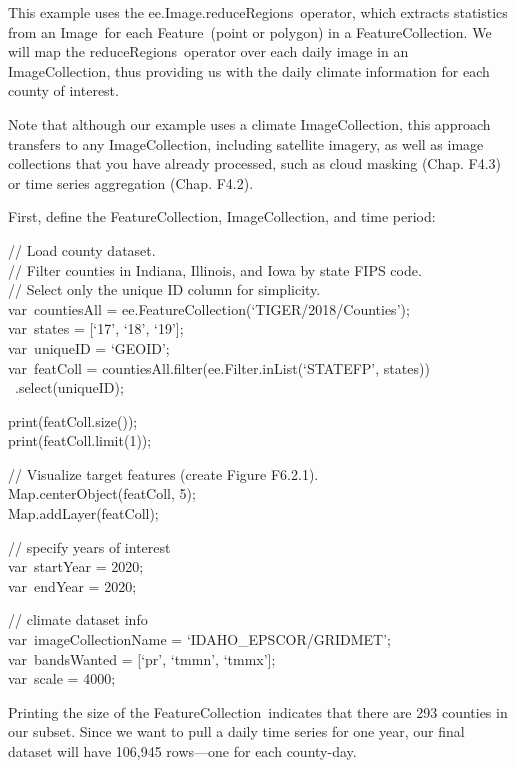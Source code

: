 \documentclass[
  letterpaper,
  DIV=11,
  numbers=noendperiod]{scrreprt}
\begin{document}
This example uses the ee.Image.reduceRegions~operator, which extracts
statistics from an Image~for each Feature~(point or polygon) in a
FeatureCollection. We will map the reduceRegions~operator over each
daily image in an ImageCollection, thus providing us with the daily
climate information for each county of interest.

Note that although our example uses a climate ImageCollection, this
approach transfers to any ImageCollection, including satellite imagery,
as well as image collections that you have already processed, such as
cloud masking (Chap. F4.3) or time series aggregation (Chap. F4.2).

First, define the FeatureCollection, ImageCollection, and time period:

// Load county dataset.\\
// Filter counties in Indiana, Illinois, and Iowa by state FIPS code.\\
// Select only the unique ID column for simplicity.\\
var~countiesAll = ee.FeatureCollection(`TIGER/2018/Counties');\\
var~states = {[}`17', `18', `19'{]};\\
var~uniqueID = `GEOID';\\
var~featColl = countiesAll.filter(ee.Filter.inList(`STATEFP', states))\\
\hspace*{0.333em} ~.select(uniqueID);

print(featColl.size());\\
print(featColl.limit(1));

// Visualize target features (create Figure F6.2.1).\\
Map.centerObject(featColl, 5);\\
Map.addLayer(featColl);

// specify years of interest\\
var~startYear = 2020;\\
var~endYear = 2020;

// climate dataset info\\
var~imageCollectionName = `IDAHO\_EPSCOR/GRIDMET';\\
var~bandsWanted = {[}`pr', `tmmn', `tmmx'{]};\\
var~scale = 4000;

Printing the size of the FeatureCollection~indicates that there are 293
counties in our subset. Since we want to pull a daily time series for
one year, our final dataset will have 106,945 rows---one for each
county-day.
\end{document}
